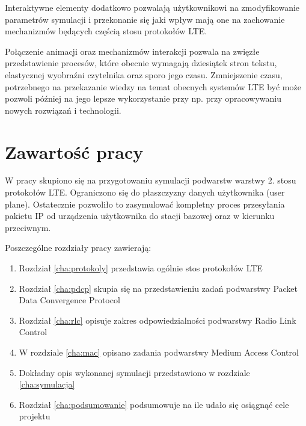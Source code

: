 Interaktywne elementy dodatkowo pozwalają użytkownikowi na zmodyfikowanie parametrów symulacji i przekonanie się jaki wpływ mają one na zachowanie mechanizmów będących częścią stosu protokołów LTE.

Połączenie animacji oraz mechanizmów interakcji pozwala na zwięzłe przedstawienie procesów, które obecnie wymagają dziesiątek stron tekstu, elastycznej wyobraźni czytelnika oraz sporo jego czasu. Zmniejszenie czasu, potrzebnego na przekazanie wiedzy na temat obecnych systemów LTE być może pozwoli później na jego lepsze wykorzystanie przy np. przy opracowywaniu nowych rozwiązań i technologii.

\section{Zawartość pracy}
\label{sec:zawartoscPracy}

W pracy skupiono się na przygotowaniu symulacji podwarstw warstwy 2. stosu protokołów LTE. Ograniczono się do płaszczyzny danych użytkownika (user plane). Ostatecznie pozwoliło to zasymulować kompletny proces przesyłania pakietu IP od urządzenia użytkownika do stacji bazowej oraz w kierunku przeciwnym.

Poszczególne rozdziały pracy zawierają:

\begin{enumerate}%

\item Rozdział \ref{cha:protokoly} przedstawia ogólnie stos protokołów LTE
\item Rozdział \ref{cha:pdcp} skupia się na przedstawieniu zadań podwarstwy Packet Data Convergence Protocol
\item Rozdział \ref{cha:rlc} opisuje zakres odpowiedzialności podwarstwy Radio Link Control
\item W rozdziale \ref{cha:mac} opisano zadania podwarstwy Medium Access Control\item Dokładny opis wykonanej symulacji przedstawiono w rozdziale \ref{cha:symulacja}
\item Rozdział \ref{cha:podsumowanie} podsumowuje na ile udało się osiągnąć cele projektu

\end{enumerate}
